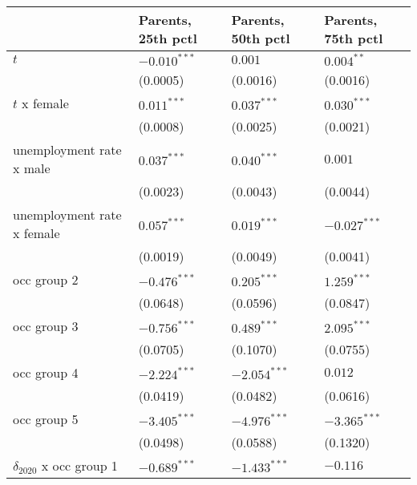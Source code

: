 \begin{tabular}{llll}
\toprule
{} & Parents, 25th pctl & Parents, 50th pctl & Parents, 75th pctl \\
\midrule
$t$                                    &     $-0.010^{***}$ &            $0.001$ &       $0.004^{**}$ \\
                                       &           (0.0005) &           (0.0016) &           (0.0016) \\
$t$ x female                           &      $0.011^{***}$ &      $0.037^{***}$ &      $0.030^{***}$ \\
                                       &           (0.0008) &           (0.0025) &           (0.0021) \\
unemployment rate x male               &      $0.037^{***}$ &      $0.040^{***}$ &            $0.001$ \\
                                       &           (0.0023) &           (0.0043) &           (0.0044) \\
unemployment rate x female             &      $0.057^{***}$ &      $0.019^{***}$ &     $-0.027^{***}$ \\
                                       &           (0.0019) &           (0.0049) &           (0.0041) \\
occ group 2                            &     $-0.476^{***}$ &      $0.205^{***}$ &      $1.259^{***}$ \\
                                       &           (0.0648) &           (0.0596) &           (0.0847) \\
occ group 3                            &     $-0.756^{***}$ &      $0.489^{***}$ &      $2.095^{***}$ \\
                                       &           (0.0705) &           (0.1070) &           (0.0755) \\
occ group 4                            &     $-2.224^{***}$ &     $-2.054^{***}$ &            $0.012$ \\
                                       &           (0.0419) &           (0.0482) &           (0.0616) \\
occ group 5                            &     $-3.405^{***}$ &     $-4.976^{***}$ &     $-3.365^{***}$ \\
                                       &           (0.0498) &           (0.0588) &           (0.1320) \\
$\delta_{2020}$ x occ group 1          &     $-0.689^{***}$ &     $-1.433^{***}$ &           $-0.116$ \\

\end{tabular}
